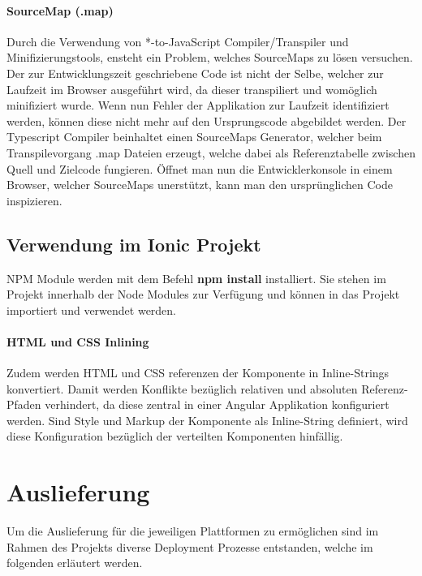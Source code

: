 \paragraph{SourceMap (.map)}

Durch die Verwendung von *-to-JavaScript Compiler/Transpiler und Minifizierungstools, ensteht ein Problem, welches SourceMaps zu lösen versuchen.
Der zur Entwicklungszeit geschriebene Code ist nicht der Selbe, welcher zur Laufzeit im Browser ausgeführt wird, da dieser transpiliert und womöglich minifiziert wurde.
Wenn nun Fehler der Applikation zur Laufzeit identifiziert werden, können diese nicht mehr auf den Ursprungscode abgebildet werden.
Der Typescript Compiler beinhaltet einen SourceMaps Generator, welcher beim Transpilevorgang .map Dateien erzeugt,
welche dabei als Referenztabelle zwischen Quell und Zielcode fungieren.
Öffnet man nun die Entwicklerkonsole in einem Browser, welcher SourceMaps unerstützt, kann man den ursprünglichen Code inspizieren.
\cite{Using97:online}



\subsection{Verwendung im Ionic Projekt}

\ac{NPM} Module werden mit dem Befehl \textbf{npm install} installiert.
Sie stehen im Projekt innerhalb der Node Modules zur Verfügung und können in das Projekt importiert und verwendet werden.




\paragraph{HTML und CSS Inlining}
Zudem werden \ac{HTML} und \ac{CSS} referenzen der Komponente in Inline-Strings konvertiert.
Damit werden Konflikte bezüglich relativen und absoluten Referenz-Pfaden verhindert,
da diese zentral in einer Angular Applikation konfiguriert werden.
Sind Style und Markup der Komponente als Inline-String definiert,
wird diese Konfiguration bezüglich der verteilten Komponenten hinfällig.
\cite{ludoh30:online}

\newpage
\section{Auslieferung}

Um die Auslieferung für die jeweiligen Plattformen zu ermöglichen
sind im Rahmen des Projekts \projectname{} diverse Deployment Prozesse entstanden,
welche im folgenden erläutert werden.

